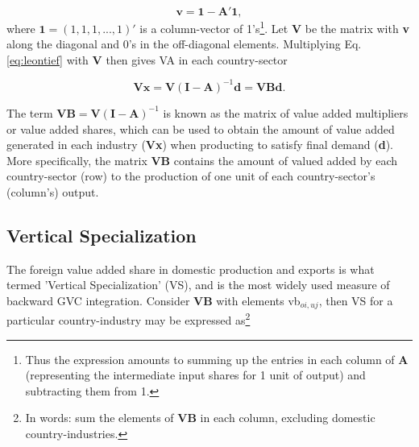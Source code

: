 \documentclass[a4paper]{article}
\begin{document}
\begin{equation}
\textbf{v} = \textbf{1} - \textbf{A}'\textbf{1},
\end{equation}
where $\textbf{1} = (1, 1, 1, ..., 1)'$ is a column-vector of 1's\footnote{Thus the expression amounts to summing up the entries in each column of \textbf{A} (representing the intermediate input shares for 1 unit of output) and subtracting them from 1.}. Let \textbf{V} be the matrix with \textbf{v} along the diagonal and 0's in the off-diagonal elements. Multiplying Eq. \ref{eq:leontief} with $\textbf{V}$ then gives VA in each country-sector

\begin{equation} \label{eq:VB}
\textbf{V}\textbf{x} = \textbf{V}(\textbf{I}-\textbf{A})^{-1} \textbf{d} = \textbf{VBd}.
\end{equation}

The term $\textbf{VB} = \textbf{V}(\textbf{I}-\textbf{A})^{-1}$ is known as the matrix of value added multipliers or value added shares, which can be used to obtain the amount of value added generated in each industry (\textbf{Vx}) when producting to satisfy final demand (\textbf{d}). More specifically, the matrix $\textbf{VB}$ contains the amount of valued added by each country-sector (row) to the production of one unit of each country-sector's (column's) output. %

\subsection{Vertical Specialization}

The foreign value added share in domestic production and exports is what \citet{hummels2001nature} termed 'Vertical Specialization' (VS), and is the most widely used measure of backward GVC integration. Consider \textbf{VB} with elements vb$_{oi,uj}$, then VS for a particular country-industry may be expressed as\footnote{In words: sum the elements of \textbf{VB} in each column, excluding domestic country-industries.}
\end{document}
